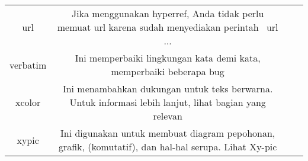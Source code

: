 \begin{table}[ht]
\begin{tabular}{cccc}
		url&Jika menggunakan hyperref, Anda tidak perlu memuat url karena sudah menyediakan perintah \ url {...}&\\
		verbatim&Ini memperbaiki lingkungan kata demi kata, memperbaiki beberapa bug&\\
		xcolor&Ini menambahkan dukungan untuk teks berwarna. Untuk informasi lebih lanjut, lihat bagian yang relevan&\\
		xypic&Ini digunakan untuk membuat diagram pepohonan, grafik, (komutatif), dan hal-hal serupa. Lihat Xy-pic&\\
		\hline
	\end{tabular}
\end{table} \par

